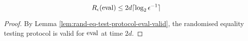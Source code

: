 \begin{theorem}
  \label{thm:eval-rand-complexity}

  $$R_\epsilon(\operatorname{eval}) \le 2d\lceil\log_2\epsilon^{-1}\rceil$$
\end{theorem}
\begin{proof}

  By Lemma \ref{lem:rand-eq-test-protocol-eval-valid}, the randomised equality testing protocol is valid for $\operatorname{eval}$ at time $2d$.
\end{proof}
